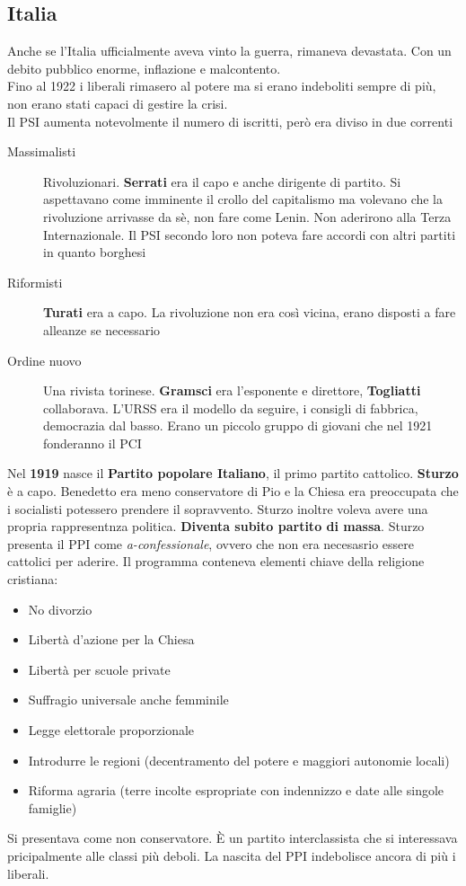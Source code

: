 \subsection{Italia}
Anche se l'Italia ufficialmente aveva vinto la guerra, rimaneva devastata. Con un debito pubblico
enorme, inflazione e malcontento.\\
Fino al 1922 i liberali rimasero al potere ma si erano indeboliti sempre di più, non erano stati
capaci di gestire la crisi.\\
Il PSI aumenta notevolmente il numero di iscritti, però era diviso in due correnti
\begin{description}
  \item[Massimalisti] Rivoluzionari. \textbf{Serrati} era il capo e anche dirigente di partito. Si
    aspettavano come imminente il crollo del capitalismo ma volevano che la rivoluzione arrivasse da
    sè, non fare come Lenin. Non aderirono alla Terza Internazionale. Il PSI secondo loro non poteva
    fare accordi con altri partiti in quanto borghesi
  \item[Riformisti] \textbf{Turati} era a capo. La rivoluzione non era così vicina, erano disposti a
    fare alleanze se necessario
  \item[Ordine nuovo] Una rivista torinese. \textbf{Gramsci} era l'esponente e direttore, 
    \textbf{Togliatti} collaborava. L'URSS era il modello da seguire, i consigli di fabbrica, 
    democrazia dal basso. Erano un piccolo gruppo di giovani che nel 1921 fonderanno il PCI
\end{description}
Nel \textbf{1919} nasce il \textbf{Partito popolare Italiano}, il primo partito cattolico. 
\textbf{Sturzo} è a capo. Benedetto  era meno conservatore di Pio  e la Chiesa era
preoccupata che i socialisti potessero prendere il sopravvento. Sturzo inoltre voleva avere una
propria rappresentnza politica. \textbf{Diventa subito partito di massa}. Sturzo presenta il PPI
come \textit{a-confessionale}, ovvero che non era necesasrio essere cattolici per aderire. Il 
programma conteneva elementi chiave della religione cristiana:
\begin{itemize}
  \item No divorzio
  \item Libertà d'azione per la Chiesa
  \item Libertà per scuole private
  \item Suffragio universale anche femminile
  \item Legge elettorale proporzionale
  \item Introdurre le regioni (decentramento del potere e maggiori autonomie locali)
  \item Riforma agraria (terre incolte espropriate con indennizzo e date alle singole famiglie)
\end{itemize}
Si presentava come non conservatore. È un partito interclassista che si interessava pricipalmente 
alle classi più deboli. La nascita del PPI indebolisce ancora di più i liberali.


